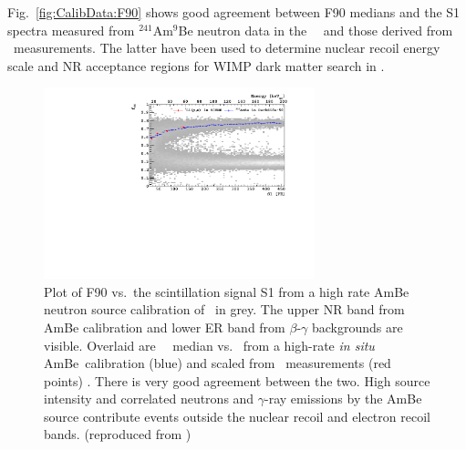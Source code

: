 Fig.~\ref{fig:CalibData:F90} shows good agreement between F90 medians and the S1 spectra measured from $^{241}$Am$^9$Be neutron data in the \dsf\ \tpc\ and those derived from \SCENE\ measurements. The latter have been used to determine nuclear recoil energy scale and NR acceptance regions for WIMP dark matter search in \cite{Agnes:2015gu, Agnes:2015_uar}.
\begin{figure}[htbp]
\centering
\includegraphics[width=0.7\textwidth]{./Figures/DSf-UArAmBeDMSStCut.pdf}
\caption{Plot of F90 vs.~the scintillation signal S1 from a high rate AmBe neutron source calibration of \dsf\ in grey. The upper NR band from AmBe calibration and lower ER band from $\beta$-$\gamma$ backgrounds are visible. Overlaid are \FNinety\ \NR\ median vs. \SOne\ from a high-rate {\it in situ} AmBe\ calibration (blue) and scaled from \SCENE\ measurements (red points) \cite{Cao:2015ks}. There is very good agreement between the two.  High source intensity and correlated neutrons and $\gamma$-ray emissions by the AmBe source contribute events outside the nuclear recoil and electron recoil bands. (reproduced from \cite{Agnes:2015_uar})\label{fig:CalibData:F90}\label{fig:DSf-UArAmBeDMS}} 
\end{figure}


